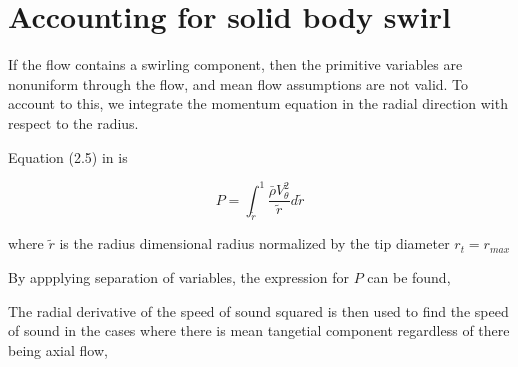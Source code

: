 \section{Accounting for solid body swirl}

If the flow contains a swirling component, then the primitive variables are 
nonuniform through the flow, and mean flow assumptions are not valid. 
To account to this, we integrate the momentum equation in the radial direction 
with respect to the radius. 

Equation (2.5) in \cite{kousen1995eigenmode} is 

\[P = \int_{\tilde{r}}^{1} \frac{\bar{\rho} V_{\theta}^2}{\tilde{r}} d\tilde{r}\] 

where $\tilde{r}$ is the radius dimensional radius normalized by the tip diameter $r_t = r_{max}$

By appplying separation of variables, the expression for $P$ can be found,




The radial derivative of the speed of sound squared is then used to find the 
speed of sound in the cases where there is mean tangetial component regardless
of there being axial flow,



